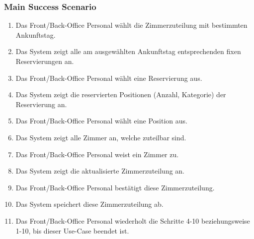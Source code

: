 \documentclass[./detailed_overview_usecases.tex]{subfiles}
\begin{document}
    \subsubsection*{Main Success Scenario}
    \begin{enumerate}
        \item Das Front/Back-Office Personal wählt die Zimmerzuteilung mit bestimmten Ankunftstag.
        \item Das System zeigt alle am ausgewählten Ankunftstag entsprechenden fixen Reservierungen an.
        \item Das Front/Back-Office Personal wählt eine Reservierung aus.
        \item Das System zeigt die reservierten Positionen (Anzahl, Kategorie) der Reservierung an.
        \item Das Front/Back-Office Personal wählt eine Position aus.
        \item Das System zeigt alle Zimmer an, welche zuteilbar sind.
        \item Das Front/Back-Office Personal weist ein Zimmer zu.
        \item Das System zeigt die aktualisierte Zimmerzuteilung an.
        \item Das Front/Back-Office Personal bestätigt diese Zimmerzuteilung.
        \item Das System speichert diese Zimmerzuteilung ab.
        \item Das Front/Back-Office Personal wiederholt die Schritte 4-10 beziehungsweise 1-10, bis dieser Use-Case beendet ist.
    \end{enumerate}
\end{document}
